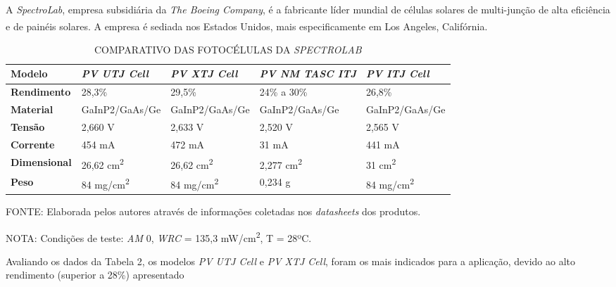 \documentclass[
	12pt,				%
	openright,			%
	oneside,			%
	a4paper,			%
	english,			%
	french,				%
	spanish,			%
	brazil,				%
	oldfontcommands
	]{abntex2}
\begin{document}
	A \textit{SpectroLab}, empresa subsidiária da \textit{The Boeing Company}, é a fabricante líder mundial de células solares de multi-junção de alta eficiência e de painéis solares. A empresa é sediada nos Estados Unidos, mais especificamente em Los Angeles, Califórnia.\textsuperscript{\cite{SpectroLab}}
	
	\begin{table}[th]
	\caption{COMPARATIVO DAS FOTOCÉLULAS DA \textit{SPECTROLAB}}
	\begin{tabular}{p{2.5cm}|p{3.1cm}|p{3.1cm}|p{3.1cm}|p{3.1cm}}
		\textbf{Modelo} & \textit{\textbf{PV UTJ Cell}} & \textit{\textbf{PV XTJ Cell}} & \textit{\textbf{PV NM TASC ITJ}} & \textit{\textbf{PV ITJ Cell}} \\
		\hline
		\textbf{Rendimento} & 28,3\% & 29,5\% & 24\% a 30\% & 26,8\% \\
		\hline
		\textbf{Material} & GaInP2/GaAs/Ge & GaInP2/GaAs/Ge & GaInP2/GaAs/Ge & GaInP2/GaAs/Ge\\
		\hline
		\textbf{Tensão} & 2,660 V & 2,633 V & 2,520 V & 2,565 V\\
		\hline
		\textbf{Corrente} & 454 mA & 472 mA & 31 mA & 441 mA\\
		\hline
		\textbf{Dimensional} & 26,62 cm\textsuperscript{2} & 26,62 cm\textsuperscript{2} & 2,277 cm\textsuperscript{2} & 31 cm\textsuperscript{2}\\
		\hline
		\textbf{Peso} & 84 mg/cm\textsuperscript{2} & 84 mg/cm\textsuperscript{2} & 0,234 g & 84 mg/cm\textsuperscript{2}\\
	\end{tabular}
	
	\begin{small}
	\vspace{3pt}
		FONTE: Elaborada pelos autores através de informações coletadas nos \textit{datasheets} dos produtos.
	\end{small}
	\begin{footnotesize}
		NOTA: Condições de teste: \textit{AM} 0, \textit{WRC} = 135,3 mW/cm\textsuperscript{2}, T = 28ºC.
	\end{footnotesize}
	\end{table}
	\pagebreak
	
	Avaliando os dados da Tabela 2, os modelos \textit{PV UTJ Cell} e \textit{PV XTJ Cell}, foram os mais indicados para a aplicação, devido ao alto rendimento (superior a 28\%) apresentado
	
\end{document}
